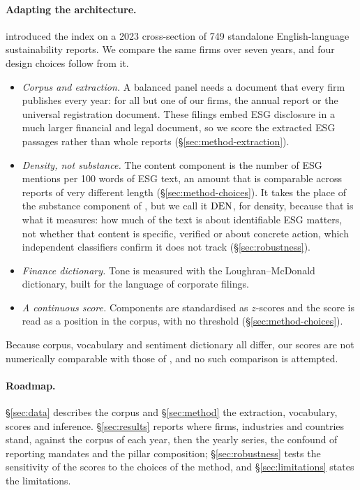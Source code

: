 \paragraph{Adapting the architecture.} \citet{lagasio2024} introduced the index
on a 2023 cross-section of 749 standalone English-language sustainability
reports. We compare the same firms over seven years, and four design choices
follow from it.
\begin{itemize}
  \item \emph{Corpus and extraction.} A balanced panel needs a document that
        every firm publishes every year: for all but one of our firms, the
        annual report or the universal registration document. These filings
        embed ESG disclosure in a much larger financial and legal document, so
        we score the extracted ESG passages rather than whole reports
        (\S\ref{sec:method-extraction}).
  \item \emph{Density, not substance.} The content component is the number of
        ESG mentions per 100 words of ESG text, an amount that is comparable
        across reports of very different length (\S\ref{sec:method-choices}).
        It takes the place of the substance component of
        \citet{lagasio2024}, but we call it $\mathrm{DEN}$, for density, because that is
        what it measures: how much of the text is about identifiable ESG
        matters, not whether that content is specific, verified or about
        concrete action, which independent classifiers confirm it does not
        track (\S\ref{sec:robustness}).
  \item \emph{Finance dictionary.} Tone is measured with the
        Loughran--McDonald dictionary, built for the language of corporate
        filings.
  \item \emph{A continuous score.} Components are standardised as $z$-scores
        and the score is read as a position in the corpus, with no threshold
        (\S\ref{sec:method-choices}).
\end{itemize}
Because corpus, vocabulary and sentiment dictionary all differ, our scores are
not numerically comparable with those of \citet{lagasio2024}, and no such
comparison is attempted.

\paragraph{Roadmap.} \S\ref{sec:data} describes the corpus and
\S\ref{sec:method} the extraction, vocabulary, scores and inference.
\S\ref{sec:results} reports where firms, industries and countries stand,
against the corpus of each year, then the yearly series, the confound of
reporting mandates and the pillar composition; \S\ref{sec:robustness} tests
the sensitivity of the scores to the choices of the method, and
\S\ref{sec:limitations} states the limitations.
